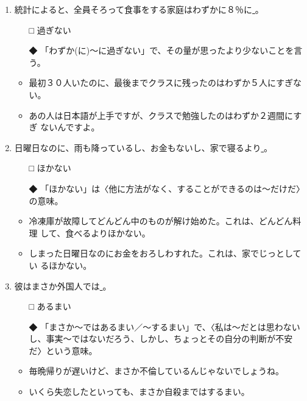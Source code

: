 \documentclass[
uplatex,
b5paper,
10pt,
dvipdfmx
]{jsbook}
\begin{document}
\begin{enumerate}
\item 統計によると、全員そろって食事をする家庭はわずかに８％に\underline{   }。

\begin{itemize}
\item[□]  過ぎない
\item[◆] 「わずか(に)〜に過ぎない」で、その量が思ったより少ないことを言う。
\end{itemize}
\begin{itemize}
\item 最初３０人いたのに、最後までクラスに残ったのはわずか５人にすぎない。
\item あの人は日本語が上手ですが、クラスで勉強したのはわずか２週間にすぎ
      ないんですよ。
\end{itemize}

\item 日曜日なのに、雨も降っているし、お金もないし、家で寝るより\underline{   
       }。

\begin{itemize}
\item[□] ほかない
\item[◆] 「ほかない」は〈他に方法がなく、することができるのは〜だけだ〉
	  の意味。
\end{itemize}
\begin{itemize}
\item 冷凍庫が故障してどんどん中のものが解け始めた。これは、どんどん料理
      して、食べるよりほかない。
\item しまった日曜日なのにお金をおろしわすれた。これは、家でじっとしてい
      るほかない。
\end{itemize}

\item 彼はまさか外国人では\underline{     }。

\begin{itemize}
\item[□]  あるまい
\item[◆] 「まさか〜ではあるまい／〜するまい」で、〈私は〜だとは思わない
	  し、事実〜ではないだろう、しかし、ちょ{}っとその自分の判断が不安
	  だ〉という意味。
\end{itemize}
\begin{itemize}
\item 毎晩帰りが遅いけど、まさか不倫しているんじゃないでしょうね。
\item いくら失恋したといっても、まさか自殺まではするまい。
\end{itemize}


\end{enumerate}
\end{document}
